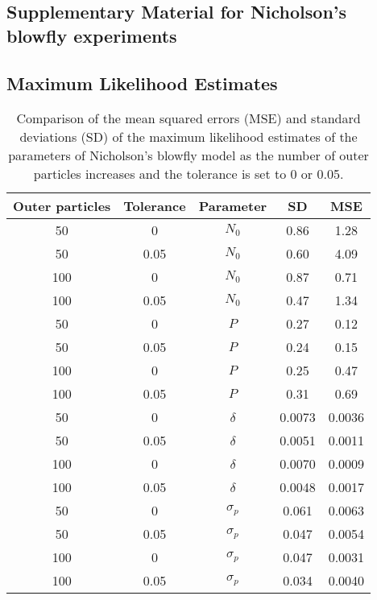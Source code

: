 \documentclass[12pt]{article}
\newcommand{\ra}[1]{\renewcommand{\arraystretch}{#1}}
\begin{document}
\begin{appendices}
\clearpage
	\section{Supplementary Material for Nicholson's blowfly experiments}
	\subsection{Maximum Likelihood Estimates}
	\begin{table}[htb]
		\centering
		\ra{1.3}
		\begin{tabular}{@{}ccccc@{}} \toprule
			Outer particles & Tolerance & Parameter &  SD & MSE \\ \midrule 
			50 & 0 & $N_0$ & 0.86 & 1.28 \\ 
			50 & 0.05 & $N_0$ & 0.60 &  4.09  \\ 
			100 & 0 & $N_0$ & 0.87 & 0.71  \\
			100 & 0.05 & $N_0$ & 0.47 & 1.34 \\
			50 & 0 & $P$ & 0.27 & 0.12 \\ 
			50 & 0.05 & $P$ & 0.24 &  0.15  \\ 
			100 & 0 & $P$ & 0.25 & 0.47  \\
			100 & 0.05 & $P$ & 0.31 & 0.69 \\
			50 & 0 & $\delta$ & 0.0073 & 0.0036 \\ 
			50 & 0.05 & $\delta$ & 0.0051 &  0.0011  \\ 
			100 & 0 & $\delta$ & 0.0070 & 0.0009  \\
			100 & 0.05 & $\delta$ & 0.0048 & 0.0017 \\
			50 & 0 & $\sigma_p$ & 0.061 &  0.0063 \\ 
			50 & 0.05 & $\sigma_p$ &  0.047 &  0.0054  \\ 
			100 & 0 & $\sigma_p$ & 0.047 & 0.0031  \\
			100 & 0.05 & $\sigma_p$ &  0.034 & 0.0040 \\\bottomrule
		\end{tabular}
		\caption{Comparison of the mean squared errors (MSE) and standard deviations (SD) of the maximum likelihood estimates of the parameters of Nicholson's blowfly model as the number of outer particles increases and the tolerance is set to 0 or 0.05.}
		\label{table:mleBlow}
	\end{table}
	

\end{appendices}
\end{document}
